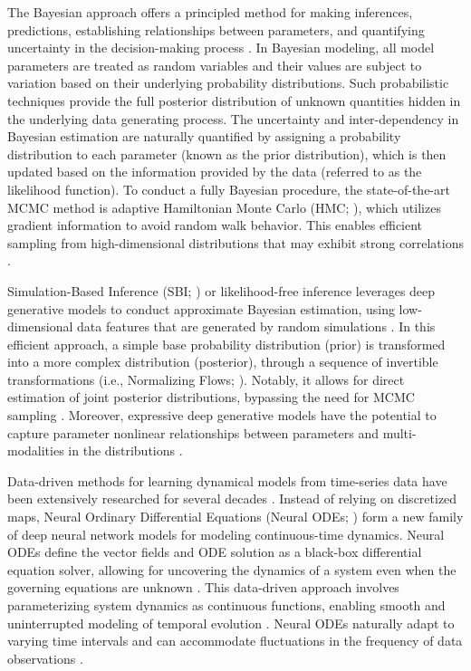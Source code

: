 \documentclass[12pt]{article}
\begin{document}
The Bayesian approach offers a principled method for making inferences, predictions, establishing relationships between parameters, and quantifying uncertainty in the decision-making process \citep{BDA, Bishop, Gelman2020, VanSchoot2021}. In Bayesian modeling, all model parameters are treated as random variables and their values are subject to variation based on their underlying probability distributions. Such probabilistic techniques provide the full posterior distribution of unknown quantities hidden in the underlying data generating process. The uncertainty and inter-dependency in Bayesian estimation are naturally quantified by assigning a probability distribution to each parameter (known as the prior distribution), which is then updated based on the information provided by the data (referred to as the likelihood function). To conduct a fully Bayesian procedure, the state-of-the-art MCMC method is adaptive Hamiltonian Monte Carlo (HMC; \cite{Duane1987, Neal2010, Hoffman2014}), which utilizes gradient information to avoid random walk behavior.  This enables efficient sampling from high-dimensional distributions that may exhibit strong correlations \citep{Betancourt2017}.



Simulation-Based Inference (SBI; \cite{Cranmer2020, Brehmer2021}) or likelihood-free inference \citep{Papamakarios2016,  Brehmer2020} leverages deep generative models to conduct approximate Bayesian estimation, using low-dimensional data features that are generated by random simulations \citep{Goncalves2020, Lueckmann2021, Boelts2022}. In this efficient approach, a simple base probability distribution (prior) is transformed into a more complex distribution (posterior), through a sequence of invertible transformations (i.e., Normalizing Flows; \cite{Rezende2015, Papamakarios2019}). Notably, it allows for direct estimation of joint posterior distributions, bypassing the need for MCMC sampling \citep{Greenberg2019, Papamakarios2019b}. Moreover, expressive deep generative models have the potential to capture parameter nonlinear relationships between parameters and multi-modalities in the distributions \citep{Hashemi2023}.


Data-driven methods for learning dynamical models from time-series data have been extensively researched for several decades \citep{Juang1994, Ljung1998, Brunton2016, Linderman2017, Duncker2019, Koppe2019, Sip2023}.
Instead of relying on discretized maps, Neural Ordinary Differential Equations (Neural ODEs; \cite{Chen2018}) form a new family of deep neural network models for modeling continuous-time dynamics. Neural ODEs define the vector fields and ODE solution as a black-box differential equation solver, allowing for uncovering the dynamics of a system even when the governing equations are unknown \citep{Dupont2019, Bilovs2021}. This data-driven approach involves parameterizing system dynamics as continuous functions, enabling smooth and uninterrupted modeling of temporal evolution \citep{Yan2019, Kim2021}. Neural ODEs naturally adapt to varying time intervals and can accommodate fluctuations in the frequency of data observations \citep{Zhu2022, Goyal2023}.
\end{document}
